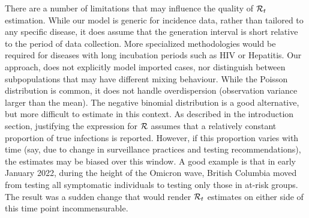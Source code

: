 
There are a number of limitations that may influence the quality of
$\mathcal{R}_t$ estimation.
While our model is
generic for incidence data, rather than tailored to any specific disease,
it does assume that the generation interval is short relative to the
period of data collection. More specialized methodologies would be required for
diseases with long incubation periods such as HIV or Hepatitis. 
Our approach, does not explicitly model imported cases, nor distinguish between
subpopulations that may have different mixing behaviour. 
While the Poisson distribution is common, it does not handle overdispersion
(observation variance larger than the mean). The negative binomial distribution
is a good alternative, but more difficult to estimate in this context.
As described in the introduction section, justifying the expression for $\mathcal{R}$ assumes
that a relatively constant proportion of true infections is reported. However,
if this proportion varies with time (say, due to change in surveillance
practices and testing recommendations), the estimates may be biased over this
window. A good example is that in early January 2022, during the height of the
Omicron wave, British Columbia moved from testing all symptomatic individuals to
testing only those in at-risk groups. The result was a sudden change that would
render $\mathcal{R}_t$ estimates on either side of this time point incommensurable.

